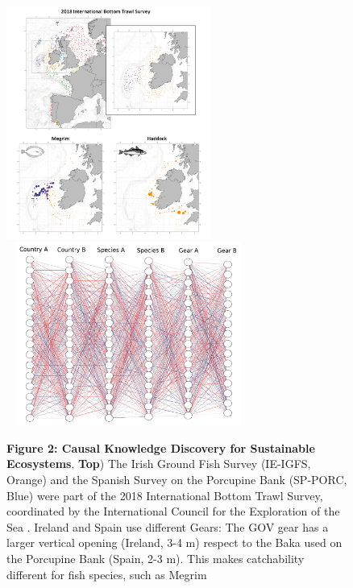 \documentclass[11pt, a4paper]{article} %
\begin{document}
   \vspace{0.15 in}
   \begin{figure}[h!]%
     \begin{center}
       \vspace{-0.25 in}
     \includegraphics[width=0.6\textwidth]{Figures/Figura.png}
     \\
     \vspace{-0.15 in}
     \includegraphics[width=8cm,height=6cm]{Figures/CKG.pdf}
     \vspace{-0.15 in}
     \caption*{\small {\bf Figure 2: Causal Knowledge Discovery for
         Sustainable Ecosystems}. {\bf Top}) The Irish Ground Fish
       Survey (IE-IGFS, Orange) and the Spanish Survey on the
       Porcupine Bank (SP-PORC, Blue) were part of the 2018
       International Bottom Trawl Survey, coordinated by the
       International Council for the Exploration of the Sea
       \citep{ices}. Ireland and Spain use different Gears: The GOV
       gear has a larger vertical opening (Ireland, 3-4 m) respect to
       the Baka used on the Porcupine Bank (Spain, 2-3 m). This makes
       catchability different for fish species, such as Megrim
}
\end{center}
\end{figure}
\end{document}
